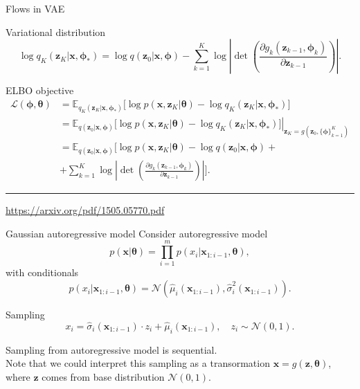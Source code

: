 \documentclass{beamer}
\newcommand{\bx}{\mathbf{x}}
\newcommand{\bz}{\mathbf{z}}
\newcommand{\btheta}{\boldsymbol{\theta}}
\newcommand{\bphi}{\boldsymbol{\phi}}
\begin{document}
\begin{frame}{Flows in VAE}
	\begin{block}{Variational distribution}
		\vspace{-0.5cm}
		\[
			\log q_K(\bz_K | \bx, \bphi_*) = \log q(\bz_0 | \bx, \bphi) - \sum_{k=1}^K \log \left| \det \left( \frac{\partial g_k(\bz_{k - 1}, \bphi_k)}{\partial \bz_{k-1}} \right) \right|.
		\]
		\vspace{-0.5cm}
	\end{block}
	\begin{block}{ELBO objective}
		\vspace{-0.5cm}
		\begin{align*}
			\mathcal{L} (\bphi, \btheta) 
			&= \mathbb{E}_{q_K(\bz_K | \bx, \bphi_*)} \bigl[\log p(\bx, \bz_K | \btheta) - \log q_K(\bz_K| \bx, \bphi_*) \bigr] \\
			&= \mathbb{E}_{q(\bz_0 | \bx, \bphi)} \left. \bigl[\log p(\bx, \bz_K | \btheta) - \log q_K(\bz_K| \bx, \bphi_*) \bigr]\right|_{\bz_K = g(\bz_0, \{\bphi\}_{k=1}^K)} \\
			&= \mathbb{E}_{q(\bz_0 | \bx, \bphi)} \bigg[\log p(\bx, \bz_K | \btheta) -  \log q(\bz_0 | \bx, \bphi ) + \\ & + \sum_{k=1}^K \log \left| \det \left( \frac{\partial g_k(\bz_{k - 1}, \bphi_k)}{\partial \bz_{k-1}} \right) \right| \bigg].
		\end{align*}
	\end{block}
	\vfill
	\hrule\medskip
	{\scriptsize \href{https://arxiv.org/pdf/1505.05770.pdf}{https://arxiv.org/pdf/1505.05770.pdf}} 
\end{frame}
\begin{frame}{Gaussian autoregressive model}
	Consider autoregressive model
	\[
		p(\bx | \btheta) = \prod_{i=1}^m p(x_i | \bx_{1:i - 1}, \btheta),
	\]
	with conditionals
	\[
	p(x_i | \bx_{1:i - 1}, \btheta) = \mathcal{N} \left(\hat{\mu}_i(\bx_{1:i-1}), \hat{\sigma}^2_i (\bx_{1:i-1})\right).
	\]
	\vspace{-0.5cm}
	\begin{block}{Sampling}
		\[
		x_i = \hat{\sigma}_i (\bx_{1:i-1}) \cdot z_i + \hat{\mu}_i(\bx_{1:i-1}), \quad z_i \sim \mathcal{N}(0, 1).
		\]
	\end{block}
	Sampling from autoregressive model is sequential. \\
	Note that we could interpret this sampling as a transormation $\bx = g(\bz, \btheta)$, where $\bz$ comes from base distribution $\mathcal{N}(0, 1)$.
\end{frame}
\end{document}
